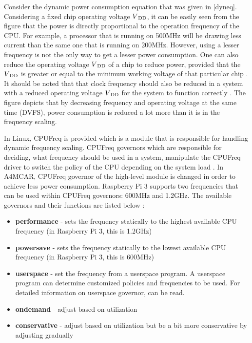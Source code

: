 Consider the dynamic power consumption equation that was given in \ref{dyneq}. Considering a fixed chip operating voltage ${V\textsubscript{DD}}$, it can be easily seen from the figure that the power is directly proportional to the operation frequency of the CPU. For example, a processor that is running on 500MHz will be drawing less current than the same one that is running on 200MHz. However, using a lesser frequency is not the only way to get a lesser power consumption. One can also reduce the operating voltage ${V\textsubscript{DD}}$ of a chip to reduce power, provided that the ${V\textsubscript{DD}}$ is greater or equal to the minimum working voltage of that particular chip \cite{dvfspaper}. It should be noted that that clock frequency should also be reduced in a system with a reduced operating voltage ${V\textsubscript{DD}}$ for the system to function correctly \cite{dvfspaper2}. The figure depicts that by decreasing frequency and operating voltage at the same time (DVFS), power consumption is reduced a lot more than it is in the frequency scaling.

In Linux, CPUFreq \cite{cpufrequencyscaling} is provided which is a module that is responsible for handling dynamic frequency scaling. CPUFreq governors which are responsible for deciding, what frequency should be used in a system, manipulate the CPUFreq driver to switch the policy of the CPU depending on the system load \cite{cpufrequencyscaling}. In A4MCAR, CPUFreq governor of the high-level module is changed in order to achieve less power consumption. Raspberry Pi 3 supports two frequencies that can be used within CPUFreq governors: 600MHz and 1.2GHz. The available governors and their functions are listed below \cite{gateworks}:

\begin{itemize}
	\item \textbf{performance} - sets the frequency statically to the highest available CPU frequency (in Raspberry Pi 3, this is 1.2GHz)
	\item \textbf{powersave} - sets the frequency statically to the lowest available CPU frequency (in Raspberry Pi 3, this is 600MHz)
	\item \textbf{userspace} - set the frequency from a userspace program. A userspace program can determine customized policies and frequencies to be used. For detailed information on userspace governor, \cite{gateworks} can be read.
	\item \textbf{ondemand} - adjust based on utilization
	\item \textbf{conservative} - adjust based on utilization but be a bit more conservative by adjusting gradually
\end{itemize}

